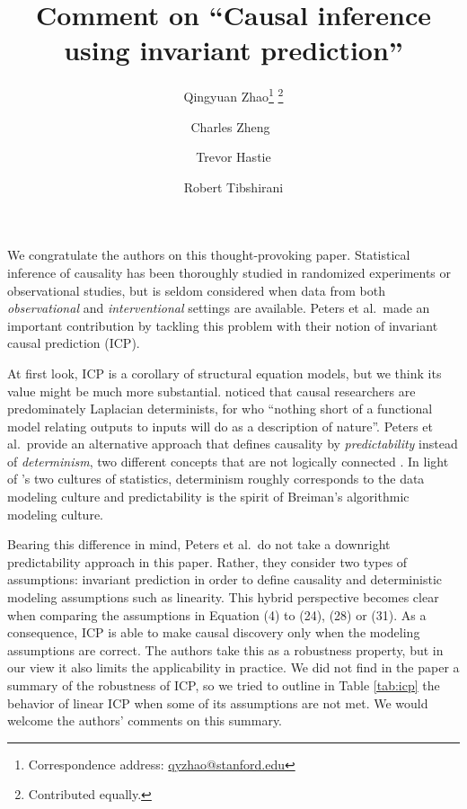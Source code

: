\documentclass{article}
\begin{document}
\title{Comment on ``Causal inference using invariant prediction''}


\author{Qingyuan Zhao\thanks{Correspondence address:
    \href{mailto:qyzhao@stanford.edu}{qyzhao@stanford.edu}}
  \footnote{Contributed equally.} }

\newcommand\CoAuthorMark{}
\author{Charles Zheng\protect\CoAuthorMark~}

\author{Trevor Hastie}

\author{Robert Tibshirani}


\date{}
\maketitle

We congratulate the authors on this thought-provoking
paper. Statistical inference of causality has been thoroughly studied
in randomized experiments or observational studies, but is seldom
considered when data from both \emph{observational}
and \emph{interventional} settings are available. Peters et
al.\ made an important contribution by tackling this problem with
their notion of invariant causal prediction (ICP).

At first look, ICP is a corollary of structural
equation models, but we think its value might be much more
substantial. \citet{dawid2000causal} noticed that causal researchers
are predominately Laplacian determinists, for who
``nothing short of a functional model relating outputs to inputs will do
as a description of nature''. Peters et al.\ provide an alternative
approach that defines causality by \emph{predictability} instead
of \emph{determinism}, two different concepts that are not logically
connected \citep{hoefer2016causal}. In light of
\citet{breiman2001statistical}'s two cultures of statistics,
determinism roughly corresponds to the data modeling culture and
predictability is the spirit of Breiman's algorithmic modeling
culture.

Bearing this difference in mind, Peters et al.\ do not take a
downright predictability approach in this paper. Rather, they consider
two types of assumptions: invariant prediction in order to define
causality and deterministic modeling assumptions such as
linearity. This hybrid perspective becomes clear when comparing the
assumptions in Equation (4) to (24), (28) or (31). As a consequence,
ICP is able to make causal discovery only when the modeling
assumptions are correct. %
The authors take this as a
robustness property, but in our view it also limits the applicability in
practice. We did not find in the paper a summary of the robustness of
ICP, so we tried to outline in Table \ref{tab:icp} the behavior of
linear ICP when some of its assumptions are not met. We would welcome
the authors' comments on this summary.
\end{document}

